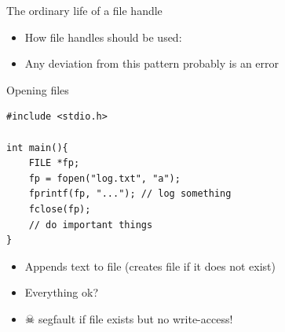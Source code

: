 \documentclass{beamer}
\newcommand{\inlineC}[1]{\lstinline[language=C]$#1$}
\begin{document}
\begin{frame}{The ordinary life of a file handle}
\begin{itemize}
\item How file handles should be used:
\end{itemize}
%
\begin{itemize} \pause
\item Any deviation from this pattern probably is an error
\end{itemize}
\end{frame}

\begin{frame}[fragile]{Opening files}
\begin{lstlisting}
#include <stdio.h>

int main(){
    FILE *fp;
    fp = fopen("log.txt", "a");
    fprintf(fp, "..."); // log something
    fclose(fp);
    // do important things
}
\end{lstlisting}
\begin{itemize}
\item Appends text to file (creates file if it does not exist)
\item Everything ok?
\pause
\item $\skull$ segfault if file exists but no write-access!
\end{itemize}
\end{frame}
\end{document}
